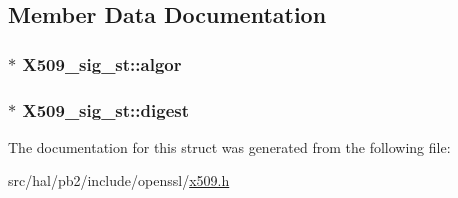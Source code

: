 \subsection{Member Data Documentation}
\subsubsection[{\texorpdfstring{algor}{algor}}]{$\ast$ X509\+\_\+sig\+\_\+st\+::algor}\hypertarget{struct_x509__sig__st_a40608d2e687f0fd15132db525c18db60}{}\label{struct_x509__sig__st_a40608d2e687f0fd15132db525c18db60}
\subsubsection[{\texorpdfstring{digest}{digest}}]{$\ast$ X509\+\_\+sig\+\_\+st\+::digest}\hypertarget{struct_x509__sig__st_aef06b1dae888d04a2cdf2f85208d0ba2}{}\label{struct_x509__sig__st_aef06b1dae888d04a2cdf2f85208d0ba2}


The documentation for this struct was generated from the following file\+:\begin{DoxyCompactItemize}
\item 
src/hal/pb2/include/openssl/\hyperlink{x509_8h}{x509.\+h}\end{DoxyCompactItemize}
